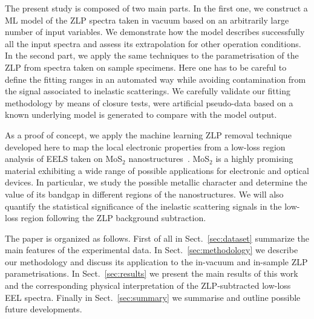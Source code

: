 The present study is composed of two main parts.
%
In the first one, we construct a ML model of the ZLP spectra taken
in vacuum based on an arbitrarily large number of input
variables.
%
We demonstrate how the model describes successfully all the
input spectra and assess its extrapolation for other operation
conditions.
%
In the second part, we apply the same techniques to
the parametrisation of the ZLP from spectra taken on sample specimens.
%
Here one has to be careful to define the fitting ranges
in an automated way while avoiding contamination from
the signal associated to inelastic scatterings.
%
We carefully validate our fitting methodology by means of closure tests, were
artificial pseudo-data based on a known underlying model is generated
to compare with the model output.

As a proof of concept, we apply the machine learning ZLP removal technique
developed here to map the local electronic properties
from a low-loss region analysis of EELS taken on
MoS$_2$ nanostructures~\cite{soniamos2}.
%
MoS$_2$ is a highly promising material exhibiting a wide range of possible applications for electronic and optical devices.
%
In particular, we study the possible metallic character and
determine the value of its
bandgap in different regions of the nanostructures.
%
We will also quantify the statistical significance of the inelastic
scattering signals in the low-loss region following the ZLP
background subtraction.

The paper is organized as follows.
%
First of all in Sect.~\ref{sec:dataset}
summarize the main features of the experimental data.
%
In Sect.~\ref{sec:methodology} we describe our methodology
and discuss its application to the in-vacuum and in-sample
ZLP parametrisations.
%
In Sect.~\ref{sec:results} we present the main results
of this work and the corresponding physical interpretation
of the ZLP-subtracted low-loss EEL spectra.
%
Finally in Sect.~\ref{sec:summary} we summarise
and outline possible future developments.
